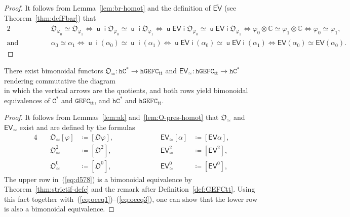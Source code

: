 \documentclass[10pt]{simplearticle}
\newcommand{\tikzinput}[1]{}
\newcommand{\GEFC}{\mathbb{\mathtt{GEFC}}}
\newcommand{\hGEFC}{\mathtt{hGEFC}}
\newcommand{\Cstar}{\mathtt{C^{*}}}
\newcommand{\hCstar}{\mathtt{hC^{*}}}
\newcommand{\mathsb}[1]{\boldsymbol{\mathsf{#1}}}
\renewcommand{\i}{\operatorname{\mathsb i}}
\renewcommand{\u}{\operatorname{\mathsb u}}
\newcommand{\EV}{\mathsb{EV}}
\newcommand{\ttt}{\operatorname{tt}}
\begin{document}
\begin{proof}
It follows from Lemma~\ref{lem:br-homot} and the definition of $\overline{\EV}$
(see Theorem~\ref{thm:defFbar}) that
\begin{alignat*}{2}
 &\ 
&\ 
& \mathfrak{O}_{\varphi_{0}}\simeq\mathfrak{O}_{\varphi_{1}}\Leftrightarrow\u\i\mathfrak{O}_{\varphi_{0}}\simeq\u\i\mathfrak{O}_{\varphi_{1}}\Leftrightarrow\u\overline{\EV}\i\mathfrak{O}_{\varphi_{0}}\simeq\u\overline{\EV}\i\mathfrak{O}_{\varphi_{1}}\Leftrightarrow\varphi_{0}\otimes\mathbb{C}\simeq\varphi_{1}\otimes\mathbb{C}\Leftrightarrow\varphi_{0}\simeq\varphi_{1},\\
\textrm{and} & \qquad &\ 
& \alpha_{0}\simeq\alpha_{1}\Leftrightarrow\u\i(\alpha_{0})\simeq\u\i(\alpha_{1})\Leftrightarrow\u\overline{\EV}\i(\alpha_{0})\simeq\u\overline{\EV}\i(\alpha_{1})\Leftrightarrow\EV(\alpha_{0})\simeq\EV(\alpha_{0}).
\end{alignat*}

\end{proof}

\begin{thm}\label{thm:OEequivs}
There
exist bimonoidal functors
$\mathfrak{O}_{\simeq}\colon\hCstar\to\hGEFC_{\ttt}$ and $\EV_{\simeq}\colon\hGEFC_{\ttt}\to\hCstar$
rendering commutative the diagram
\begin{equation}
\tikzinput{d578}\label{eq:d578}
\end{equation}
in which the vertical arrows are the quotients, and both rows yield
bimonoidal equivalences of $\Cstar$ and $\GEFC_{\ttt}$, and $\hCstar$
and $\hGEFC_{\ttt}$.
\end{thm}

\begin{proof}
It follows from Lemmas~\ref{lem:ak} and~\ref{lem:O-pres-homot}
that $\mathfrak{O}_{\simeq}$ and $\EV_{\simeq}$ exist and are defined
by the formulas
\begin{alignat}{4}
 &\ 
& \mathfrak{O}_{\simeq}[\varphi] & \coloneqq[\mathfrak{O}\varphi], & \qquad\qquad &\ 
& \EV_{\simeq}[\alpha] & \coloneqq[\EV\alpha],\label{eq:oeeq1}\\
 &\ 
& \mathfrak{O}^{2}_{\simeq} & \coloneqq[\mathfrak{O}^{2}], &\ 
&\ 
& \EV^{2}_{\simeq} & \coloneqq[\EV^{2}],\label{eq:oeeq2}\\
 &\ 
& \mathfrak{O}^{0}_{\simeq} & \coloneqq[\mathfrak{O}^{0}], &\ 
&\ 
& \EV^{0}_{\simeq} & \coloneqq[\EV^{0}],\label{eq:oeeq3}
\end{alignat}
The upper row in~(\ref{eq:d578}) is a bimonoidal equivalence by
Theorem~\ref{thm:strictif-defc} and the remark after Definition~\ref{def:GEFCtt}.
Using this fact together with~(\ref{eq:oeeq1})--(\ref{eq:oeeq3}),
one can show that the lower row is also a bimonoidal equivalence.
\end{proof}
\end{document}
